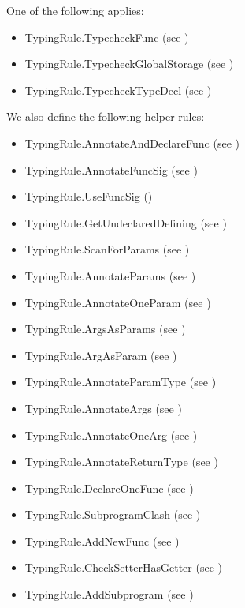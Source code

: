 \documentclass{book}
\begin{document}
One of the following applies:
\begin{itemize}
  \item TypingRule.TypecheckFunc (see )
  \item TypingRule.TypecheckGlobalStorage (see )
  \item TypingRule.TypecheckTypeDecl (see )
\end{itemize}
We also define the following helper rules:
\begin{itemize}
  \item TypingRule.AnnotateAndDeclareFunc (see )
  \item TypingRule.AnnotateFuncSig (see )
  \item TypingRule.UseFuncSig ()
  \item TypingRule.GetUndeclaredDefining (see )
  \item TypingRule.ScanForParams (see )
  \item TypingRule.AnnotateParams (see )
  \item TypingRule.AnnotateOneParam (see )
  \item TypingRule.ArgsAsParams (see )
  \item TypingRule.ArgAsParam (see )
  \item TypingRule.AnnotateParamType (see )
  \item TypingRule.AnnotateArgs (see )
  \item TypingRule.AnnotateOneArg (see )
  \item TypingRule.AnnotateReturnType (see )
  \item TypingRule.DeclareOneFunc (see )
  \item TypingRule.SubprogramClash (see )
  \item TypingRule.AddNewFunc (see )
  \item TypingRule.CheckSetterHasGetter (see )
  \item TypingRule.AddSubprogram (see )

\end{itemize}
\end{document}
